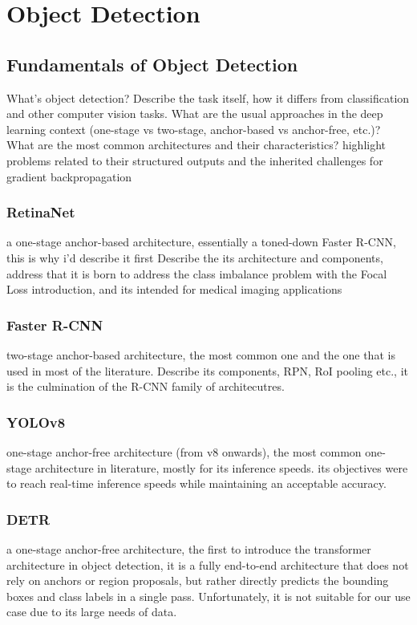 \chapter{Object Detection}
\label{ch:object-detection}
\section{Fundamentals of Object Detection}
What's object detection? Describe the task itself, how it differs from  classification and other computer vision tasks. What are the usual approaches in the deep learning context (one-stage vs two-stage, anchor-based vs anchor-free, etc.)? What are the most common architectures and their characteristics? 
highlight problems related to their structured outputs and the inherited challenges for gradient backpropagation 

\subsection{RetinaNet}
a one-stage anchor-based architecture, essentially a toned-down Faster R-CNN, this is why i'd describe it first
Describe the its architecture and components, address that it is born to address the class imbalance problem with the Focal Loss introduction, and its intended for medical imaging applications

\subsection{Faster R-CNN}
two-stage anchor-based architecture, the most common one and the one that is used in most of the literature.
Describe its components, RPN, RoI pooling etc., it is the culmination of the R-CNN family of architecutres.

\subsection{YOLOv8}
one-stage anchor-free architecture (from v8 onwards), the most common one-stage architecture in literature, mostly for its inference speeds. its objectives were to reach real-time inference speeds while maintaining an acceptable accuracy.

\subsection{DETR}
a one-stage anchor-free architecture, the first to introduce the transformer architecture in object detection, it is a fully end-to-end architecture that does not rely on anchors or region proposals, but rather directly predicts the bounding boxes and class labels in a single pass. Unfortunately, it is not suitable for our use case due to its large needs of data.

